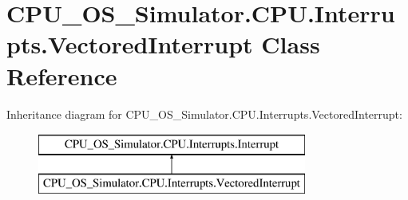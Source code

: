 \hypertarget{class_c_p_u___o_s___simulator_1_1_c_p_u_1_1_interrupts_1_1_vectored_interrupt}{}\section{C\+P\+U\+\_\+\+O\+S\+\_\+\+Simulator.\+C\+P\+U.\+Interrupts.\+Vectored\+Interrupt Class Reference}
\label{class_c_p_u___o_s___simulator_1_1_c_p_u_1_1_interrupts_1_1_vectored_interrupt}
Inheritance diagram for C\+P\+U\+\_\+\+O\+S\+\_\+\+Simulator.\+C\+P\+U.\+Interrupts.\+Vectored\+Interrupt\+:\begin{figure}[H]
\begin{center}
\leavevmode
\includegraphics[height=2.000000cm]{class_c_p_u___o_s___simulator_1_1_c_p_u_1_1_interrupts_1_1_vectored_interrupt}
\end{center}
\end{figure}
